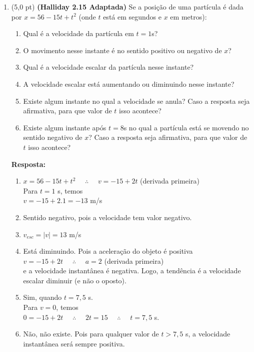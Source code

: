 \documentclass[12pt,a4paper,oneside]{article}
\begin{document}
\begin{enumerate}

\item (5,0 pt) {\bf (Halliday 2.15 Adaptada)} Se a posição de uma partícula é dada por $x = 56 -15t  + t^2$ (onde $t$ está em segundos e $x$ em metros):
\begin{enumerate}
	\item Qual é a velocidade da partícula em $t = 1$s? 
	\item O movimento nesse instante é no sentido positivo ou negativo de $x$? 
	\item Qual é a velocidade escalar da partícula nesse instante?
	\item A velocidade escalar está aumentando	ou diminuindo nesse instante?
	\item Existe algum instante no 	qual a velocidade se anula? Caso a resposta seja afirmativa, para que valor de $t$ isso acontece? 
	\item Existe algum instante após  $t  = 8$s	no qual a partícula está se movendo no sentido negativo de $x$?  Caso a resposta seja afirmativa, para que valor de $t$ isso acontece?
\end{enumerate}

\vspace{0.3cm}

{ \color{blue} 
	{\bf Resposta:} 
	\begin{enumerate}
		\item $x = 56 -15t  + t^2$ \ \ 
		$\therefore$ \ \  $v = -15 + 2t$ (derivada primeira)\\
		Para $t = 1$ s, temos \\
		$v = -15 + 2.1 = -13$ m/s
		\item Sentido negativo, pois a velocidade tem valor negativo.
		\item $v_{esc} = |v| = 13$ m/s
		\item Está diminuindo. Pois a aceleração do objeto é positiva \\
		$v = -15 + 2t$ \ \ 
		$\therefore$ \ \  $a = 2$ (derivada primeira)\\
		e a velocidade instantânea é negativa. Logo, a tendência é a velocidade escalar diminuir (e não o oposto).
		\item Sim, quando $t = 7,5$ s. \\
		Para $v=0$, temos\\
		$0 = -15 + 2t$ \ \ $\therefore$ \ \ $2t = 15$ \ \ $\therefore$ \ \ $t = 7,5$ s.
		\item Não, não existe. Pois para qualquer valor de $t >  7,5$ s, a velocidade instantânea será sempre positiva.
	\end{enumerate}
}


\end{enumerate}
\end{document}
